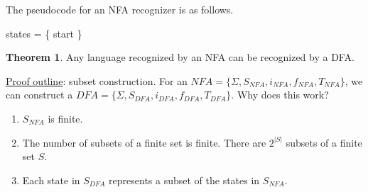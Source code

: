 \documentclass[]{article}
\theoremstyle{definition}
\newtheorem*{theorem}{Theorem}
\begin{document}
				The pseudocode for an NFA recognizer is as follows. \\
				\begin{algorithm}[H]
					states = \{ start \}\;
				\end{algorithm}

				\begin{theorem}
					Any language recognized by an NFA can be recognized by a DFA.
				\end{theorem}

				\underline{Proof outline}: subset construction. For an $NFA = \{ \Sigma, S_{NFA}, i_{NFA}, f_{NFA}, T_{NFA} \}$, we can construct a $DFA = \{ \Sigma, S_{DFA}, i_{DFA}, f_{DFA}, T_{DFA} \}$. Why does this work?
				\begin{enumerate}
					\item $S_{NFA}$ is finite.
					\item The number of subsets of a finite set is finite. There are $2^{|S|}$ subsets of a finite set $S$.
					\item Each state in $S_{DFA}$ represents a subset of the states in $S_{NFA}$.
				\end{enumerate}
\end{document}
